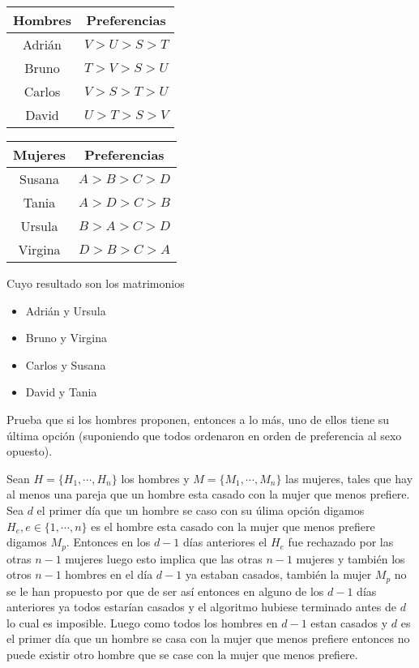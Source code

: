 \documentclass[answers,11pt]{exam}
\begin{document}
\begin{questions}
\begin{center}
    \begin{tabular}{|c|c|}
    \hline
    Hombres & Preferencias \\ 
    \hline 
    Adri\'an & $V > U > S > T$ \\
    Bruno & $T > V > S > U$ \\
    Carlos & $V > S > T > U$ \\
    David & $ U > T > S > V$ \\
    \hline
    \end{tabular}
    \hspace{2cm}
    \begin{tabular}{|c|c|}
    \hline
    Mujeres & Preferencias \\
    \hline
    Susana & $A > B > C > D$ \\
    Tania & $A > D > C > B$ \\
    Ursula & $B > A > C > D$ \\ 
    Virgina & $D > B > C > A$ \\
    \hline
    \end{tabular}
\end{center}

Cuyo resultado son los matrimonios

\begin{itemize}
    \item Adrián y Ursula
    \item Bruno y Virgina
    \item Carlos y Susana
    \item David y Tania
\end{itemize}

\question Prueba que si los hombres proponen, entonces a lo m\'as, uno de ellos tiene su \'ultima opci\'on (suponiendo que todos ordenaron en orden de preferencia al sexo opuesto).

Sean $H = \{H_1,\cdots,H_n\}$ los hombres y $M = \{M_1,\cdots,M_n\}$ las mujeres, tales que hay al menos una pareja que un hombre esta casado con la mujer que menos prefiere. Sea $d$ el primer día que un hombre se caso con su úlima opción digamos $H_e, e \in \{1,\cdots,n\}$ es el hombre esta casado con la mujer que menos prefiere digamos $M_p$. Entonces en los $d-1$ días anteriores el $H_e$ fue rechazado por las otras $n-1$ mujeres luego esto implica que las otras $n-1$ mujeres y también los otros $n-1$ hombres en el día $d-1$ ya estaban casados, también la mujer $M_p$ no se le han propuesto por que de ser así entonces en alguno de los $d-1$ días anteriores ya todos estarían casados y el algoritmo hubiese terminado antes de $d$ lo cual es imposible. Luego como todos los hombres en $d-1$ estan casados y $d$ es el primer día que un hombre se casa con la mujer que menos prefiere entonces no puede existir otro hombre que se case con la mujer que menos prefiere.


\end{questions}
\end{document}
